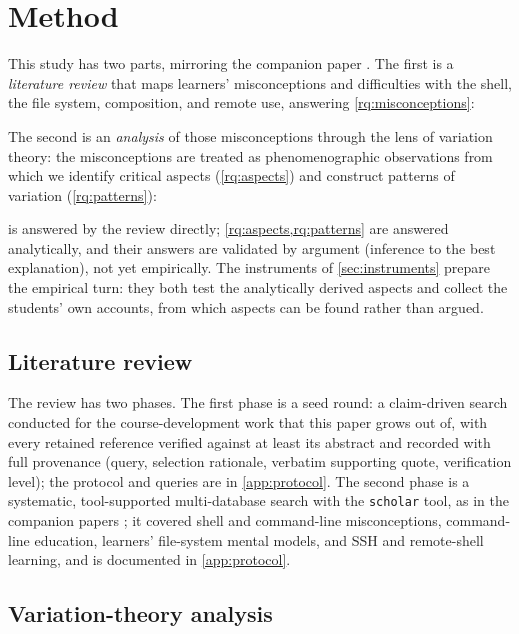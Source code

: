 \mode*
\section{Method}

This study has two parts, mirroring the companion paper
\autocite{VTProgMisconceptions}.
The first is a \emph{literature review} that maps learners' misconceptions
and difficulties with the shell, the file system, composition, and remote
use, answering \cref{rq:misconceptions}:

\rqmisconceptions*

The second is an \emph{analysis} of those misconceptions through the lens of
variation theory: the misconceptions are treated as phenomenographic
observations from which we identify critical aspects
(\cref{rq:aspects}) and construct patterns of variation
(\cref{rq:patterns}):

\rqaspects*
\rqpatterns*

 is answered by the review directly;
\cref{rq:aspects,rq:patterns} are answered analytically, and their answers
are validated by argument (inference to the best explanation), not yet
empirically.
The instruments of \cref{sec:instruments} prepare the empirical turn: they
both test the analytically derived aspects and collect the students' own
accounts, from which aspects can be found rather than argued.

\subsection{Literature review}
\label{sec:method-litreview}

The review has two phases.
The first phase is a seed round: a claim-driven search conducted for the
course-development work that this paper grows out of, with every retained
reference verified against at least its abstract and recorded with full
provenance (query, selection rationale, verbatim supporting quote,
verification level); the protocol and queries are in \cref{app:protocol}.
The second phase is a systematic, tool-supported multi-database search with
the \texttt{scholar} tool, as in the companion papers
\autocite{VTProgMisconceptions,VTDebug}; it covered shell and command-line
misconceptions, command-line education, learners' file-system mental models,
and SSH and remote-shell learning, and is documented in \cref{app:protocol}.

\subsection{Variation-theory analysis}
\label{sec:method-vt-analysis}

